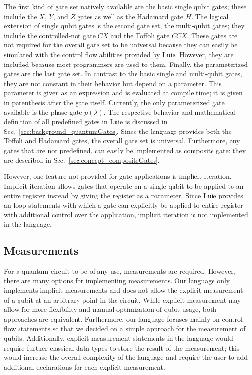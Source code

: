 The first kind of gate set natively available are the basic single qubit gates; these include the $X$, $Y$, and $Z$ gates as well as the Hadamard gate $H$. The logical extension of single qubit gates is the second gate set, the multi-qubit gates; they include the controlled-not gate $CX$ and the Toffoli gate $CCX$. These gates are not required for the overall gate set to be universal because they can easily be simulated with the control flow abilities provided by Luie. However, they are included because most programmers are used to them.
Finally, the parameterized gates are the last gate set. In contrast to the basic single and multi-qubit gates, they are not constant in their behavior but depend on a parameter. This parameter is given as an expression and is evaluated at compile time; it is given in parenthesis after the gate itself. Currently, the only parameterized gate available is the phase gate $p(\lambda)$.
The respective behavior and mathematical definition of all predefined gates in Luie is discussed in Sec.~\ref{sec:background_quantumGates}. Since the language provides both the Toffoli and Hadamard gates, the overall gate set is universal. Furthermore, any gates that are not predefined, can easily be implemented as composite gate; they are described in Sec.~\ref{sec:concept_compositeGates}.

However, one feature not provided for gate applications is implicit iteration. Implicit iteration allows gates that operate on a single qubit to be applied to an entire register instead by giving the register as a parameter. Since Luie provides an loop statements with which a gate can explicitly be applied to entire register with additional control over the application, implicit iteration is not implemented in the language.  

\subsection{Measurements}
\label{sec:concept_measurement}
For a quantum circuit to be of any use, measurements are required. However, there are many options for implementing measurements. Our language only implements implicit measurements and does not allow the explicit measurement of a qubit at an arbitrary point in the circuit. While explicit measurement may allow for more flexibility and manual optimization of qubit usage, both approaches are equivalent. Furthermore, our language focuses mainly on control flow statements so that we decided on a simple approach for the measurement of qubits. Additionally, explicit measurement statements in the language would require further classical data types to store the result of the measurement; this would increase the overall complexity of the language and require the user to add additional declarations for each explicit measurement.

